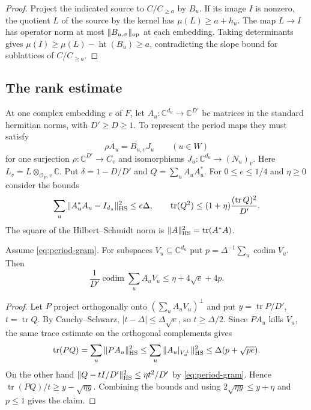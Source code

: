 \begin{proof}
Project the indicated source to $C/C_{\ge a}$ by $B_u$. If its image
$I$ is nonzero, the quotient $L$ of the source by the kernel has
$\mu(L)\ge a+h_u$. The map $L\to I$ has operator norm at most
$\|B_{u,\sigma}\|_{\rm op}$ at each embedding. Taking determinants gives
$\mu(I)\ge\mu(L)-\operatorname{ht}(B_u)\ge a$, contradicting the
slope bound for sublattices of $C/C_{\ge a}$.
\end{proof}

\subsection{The rank estimate}

At one complex embedding $v$ of $F$, let
$A_u:\mathbb C^{d_u}\to\mathbb C^{D'}$ be matrices in the standard
hermitian norms, with $D'\ge D\ge1$. To represent the period maps they
must satisfy
\begin{equation}\label{eq:period-rows}
 \rho A_u=B_{u,v}J_u \qquad (u\in W)
\end{equation}
for one surjection $\rho:\mathbb C^{D'}\to C_v$ and isomorphisms
$J_u:\mathbb C^{d_u}\to (N_u)_v$. Here $L_v=L\otimes_{\mathcal O_F,v}
\mathbb C$. Put $\delta=1-D/D'$ and $Q=\sum_u A_uA_u^*$.
For $0\le e\le1/4$ and $\eta\ge0$ consider the bounds
\begin{equation}\label{eq:period-gram}
 \sum_u\|A_u^*A_u-I_{d_u}\|_{\rm HS}^2\le e\Delta,\qquad
 \operatorname{tr}(Q^2)\le(1+\eta)\frac{(\operatorname{tr}Q)^2}{D'} .
\end{equation}
The square of the Hilbert--Schmidt norm is $\|A\|_{\rm HS}^2
=\operatorname{tr}(A^*A)$.

\begin{lemma}\label{lem:period-rank}
Assume \eqref{eq:period-gram}. For subspaces
$V_u\subseteq\mathbb C^{d_u}$ put $p=\Delta^{-1}\sum_u\operatorname{codim}V_u$.
Then
\[
 \frac1{D'}\operatorname{codim}\sum_u A_uV_u
       \le \eta+4\sqrt e+4p .
\]
\end{lemma}

\begin{proof}
Let $P$ project orthogonally onto $(\sum_u A_uV_u)^\perp$ and put
$y=\operatorname{tr}P/D'$, $t=\operatorname{tr}Q$. By Cauchy--Schwarz,
$|t-\Delta|\le\Delta\sqrt e$, so $t\ge\Delta/2$. Since $PA_u$ kills
$V_u$, the same trace estimate on the orthogonal complements gives
\[
 \operatorname{tr}(PQ)=\sum_u\|PA_u\|_{\rm HS}^2
 \le \sum_u\|A_u|_{V_u^\perp}\|_{\rm HS}^2
 \le \Delta(p+\sqrt{pe}).
\]
On the other hand $\|Q-tI/D'\|_{\rm HS}^2\le\eta t^2/D'$ by
\eqref{eq:period-gram}. Hence $\operatorname{tr}(PQ)/t\ge
y-\sqrt{\eta y}$. Combining the bounds and using
$2\sqrt{\eta y}\le y+\eta$ and $p\le1$ gives the claim.
\end{proof}

